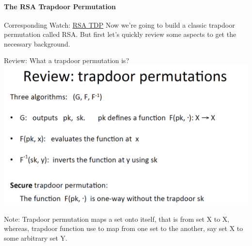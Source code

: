 \documentclass[11pt]{article}
\makeatletter
\def\maxwidth{\ifdim\Gin@nat@width>\linewidth\linewidth
    \else\Gin@nat@width\fi}
\let\Oldincludegraphics\includegraphics
\renewcommand{\includegraphics}[1]{\Oldincludegraphics[width=.8\maxwidth]{#1}}
\makeatother
\begin{document}
\hypertarget{the-rsa-trapdoor-permutation}{%
\paragraph{The RSA Trapdoor
Permutation}\label{the-rsa-trapdoor-permutation}}

Corresponding Watch:
\href{https://www.coursera.org/learn/crypto/lecture/JrGlH/the-rsa-trapdoor-permutation}{RSA
TDP} Now we're going to build a classic trapdoor permutation called RSA.
But first let's quickly review some aspects to get the necessary
background.

Review: What a trapdoor permutation is?
\includegraphics{./Images/TDP-Review.png}

Note: Trapdoor permutation maps a set onto itself, that is from set X to
X, whereas, trapdoor function use to map from one set to the another,
say set X to some arbitrary set Y.
\end{document}
